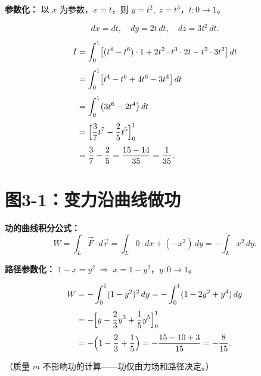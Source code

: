 \documentclass[12pt,a4paper]{ctexart}
\newcommand{\answerbox}[1]{%
  \begin{center}
  \fbox{\color{red}\large\bfseries #1}
  \end{center}
}
\begin{document}
\bigskip

\noindent\textbf{参数化：} 以 $x$ 为参数，$x=t$，则 $y=t^2,\;z=t^3$，$t:0\to1$。

\[
dx = dt,\quad dy = 2t\,dt,\quad dz = 3t^2\,dt.
\]

\[
\begin{aligned}
I &= \int_0^1 \bigl[(t^4 - t^6)\cdot 1 + 2t^2\cdot t^3\cdot 2t - t^2\cdot 3t^2\bigr]\,dt \\[4pt]
  &= \int_0^1 \bigl[t^4 - t^6 + 4t^6 - 3t^4\bigr]\,dt \\[4pt]
  &= \int_0^1 \bigl(3t^6 - 2t^4\bigr)\,dt \\[4pt]
  &= \Bigl[\frac{3}{7}t^7 - \frac{2}{5}t^5\Bigr]_0^1 \\[4pt]
  &= \frac{3}{7} - \frac{2}{5}
   = \frac{15 - 14}{35}
   = \frac{1}{35}.
\end{aligned}
\]

\answerbox{$I = \dfrac{1}{35}$}

\newpage
\section{图3-1：变力沿曲线做功}


\bigskip

\noindent\textbf{功的曲线积分公式：}
\[
W = \int_L \vec{F}\cdot d\vec{r} = \int_L 0\cdot dx + (-x^2)\,dy = -\int_L x^2\,dy.
\]

\noindent\textbf{路径参数化：} $1-x=y^2 \;\Rightarrow\; x = 1-y^2$，$y:0\to1$。

\[
\begin{aligned}
W &= -\int_0^1 (1-y^2)^2\,dy
   = -\int_0^1 (1 - 2y^2 + y^4)\,dy \\[4pt]
  &= -\Bigl[y - \frac{2}{3}y^3 + \frac{1}{5}y^5\Bigr]_0^1 \\[4pt]
  &= -\Bigl(1 - \frac{2}{3} + \frac{1}{5}\Bigr)
   = -\frac{15 - 10 + 3}{15}
   = -\frac{8}{15}.
\end{aligned}
\]

\answerbox{$W = -\dfrac{8}{15}$}

（质量 $m$ 不影响功的计算——功仅由力场和路径决定。）

\newpage
\end{document}
